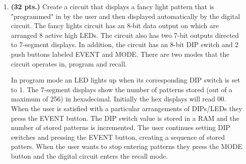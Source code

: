 \begin{enumerate}
The user moves between the states by pressing the buttons
as shown in Figure~\ref{fig:stopwatch_fsm}.
button while in each of the five states.  Please note, while 
similar to the final state diagram, the state diagram shown in 
Figure~\ref{fig:stopwatch_fsm} will not work in the final circuit
because the user will probably hold down the buttons for more 
than a single clock cycles.  See page~\pageref{page:push_dp}
for more details.

\begin{figure}[ht]
\caption{The users view of the stopwatch FSM.}
\label{fig:stopwatch_fsm}
\end{figure}

There are some major datapath elements which must be addressed
before the design is complete.  the following are some suggestions
to focus your thinking.
\begin{enumerate}
\item Generate a 1 Hz signal to feed into the timer counters
and the BLINK signal.
\item Build a mod 10 counter for unit second and minute.
\item Build a mod 6 counter for the tens of second counter.
\item Use control signals to tell the counter when to count
up.  Do not AND together control signals with the clock.
\end{enumerate}

Turn in; an algorithm
the datapath and control unit,
the control word table,
the memory input equations, and
output equations.
The control unit is to be implemented using a ones hot encoding.


\item\textbf{ (32 pts.)} Create a circuit that displays a fancy light 
pattern that is "programmed" in by the user and then displayed
automatically by the digital circuit.  The fancy lights circuit
has an 8-bit data output on which are arranged 8 active high LEDs.
The circuit also has two 7-bit outputs directed to 7-segment
displays.  In addition, the circuit has an 8-bit DIP switch and 2 
push buttons labeled EVENT and MODE.  There are two modes that the 
circuit operates in, program and recall.

In program mode an LED lights up when its corresponding DIP switch
is set to 1.   The 7-segment displays show the number of patterns
stored (out of a maximum of 256) in hexadecimal.  Initially
the hex displays will read 00.  When the user is satisfied with a 
particular arrangements of DIPs/LEDs they press the EVENT button.
The DIP switch value is stored in a RAM and the number of stored patterns
is incremented.  The user continues setting DIP switches and pressing
the EVENT button, creating a sequence of stored patters.  When the
user wants to stop entering patterns they press the MODE button and
the digital circuit enters the recall mode.


\end{enumerate}
